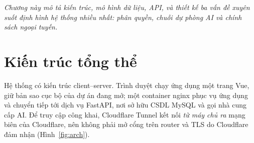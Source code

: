 \documentclass[../main.tex]{subfiles}
\begin{document}
\textit{Chương này mô tả kiến trúc, mô hình dữ liệu, API, và thiết kế ba vấn đề xuyên suốt định
hình hệ thống nhiều nhất: phân quyền, chuỗi dự phòng AI và chính sách ngoại tuyến.}

\section{Kiến trúc tổng thể}
Hệ thống có kiến trúc client--server. Trình duyệt chạy ứng dụng một trang Vue, giữ bản sao cục bộ của
dự án đang mở; một container nginx phục vụ ứng dụng và chuyển tiếp  tới dịch vụ FastAPI,
nơi sở hữu CSDL MySQL và gọi nhà cung cấp AI. Để truy cập công khai, Cloudflare Tunnel kết nối
\emph{từ máy chủ ra} mạng biên của Cloudflare, nên không phải mở cổng trên router và TLS do
Cloudflare đảm nhận (Hình~\ref{fig:arch}).
\end{document}
